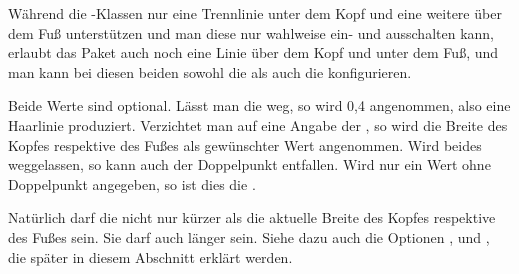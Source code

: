 \begin{Declaration}
\end{Declaration}
%
%
%
%
Während die \KOMAScript-Klassen nur eine Trennlinie unter dem Kopf und eine
weitere über dem Fuß unterstützen und man diese nur wahlweise ein- und
ausschalten kann, erlaubt das Paket  auch noch eine
Linie über dem Kopf und unter dem Fuß, und man kann bei diesen beiden sowohl
die  als auch die  konfigurieren.

Beide Werte sind optional. Lässt man die  weg, so wird
0,4 angenommen, also eine Haarlinie produziert. Verzichtet man auf
eine Angabe der , so wird die Breite des Kopfes respektive des
Fußes als gewünschter Wert angenommen. Wird beides weggelassen, so kann auch
der Doppelpunkt entfallen. Wird nur ein Wert ohne Doppelpunkt angegeben, so
ist dies die .

Natürlich darf die  nicht nur kürzer als die aktuelle Breite des
Kopfes respektive des Fußes sein. Sie darf auch länger sein. Siehe dazu auch
die Optionen %
,
 und
, die später in diesem
Abschnitt erklärt werden.


